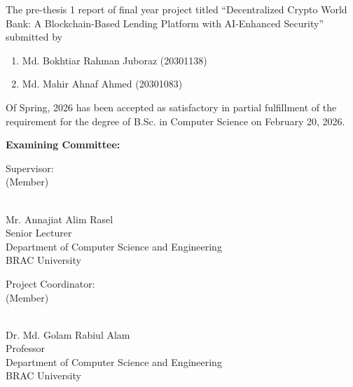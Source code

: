 \documentclass[12pt, a4paper]{report}
\begin{document}
The pre-thesis 1 report of final year project titled ``Decentralized Crypto World Bank: A Blockchain-Based Lending Platform with AI-Enhanced Security'' submitted by

\begin{enumerate}
\item Md. Bokhtiar Rahman Juboraz (20301138)
\item Md. Mahir Ahnaf Ahmed (20301083)
\end{enumerate}

Of Spring, 2026 has been accepted as satisfactory in partial fulfillment of the requirement for the degree of B.Sc. in Computer Science on February 20, 2026.

\vspace{1cm}

\textbf{Examining Committee:}

\vspace{1.5cm}

\begin{flushleft}
Supervisor:\\
(Member)
\end{flushleft}

\begin{flushright}
\vspace{-0.5cm}
\hrulefill\\
Mr. Annajiat Alim Rasel\\
Senior Lecturer\\
Department of Computer Science and Engineering\\
BRAC University
\end{flushright}

\vspace{1.5cm}

\begin{flushleft}
Project Coordinator:\\
(Member)
\end{flushleft}

\begin{flushright}
\vspace{-0.5cm}
\hrulefill\\
Dr. Md. Golam Rabiul Alam\\
Professor\\
Department of Computer Science and Engineering\\
BRAC University
\end{flushright}

\newpage
\thispagestyle{empty}

\null\vfill
\end{document}
